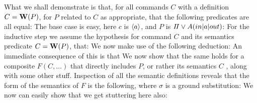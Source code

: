 What we shall demonstrate is that, for all commands $C$
with a definition $C = \mathbf{W}(P)$, for $P$ related to $C$ as appropriate,
that the following predicates are all equal:
The base case is easy, here $c$ is $\langle a\rangle$,
and $P$ is $I\!I \lor A(in|a|out)$:
For the inductive step we assume the hypothesis
for command $C$ and its semantics predicate  $C = \mathbf{W}(P)$,
that:
We now make use of the following deduction:
An immediate consequence of this is that
We now show that the same holds for a composite $F(C,\ldots)$
that directly includes $P$, or rather its semantics $C$
, along with some other stuff.
Inspection of all the semantic definitions reveals
that the form of the semantics of $F$ is the following,
where $\sigma$ is a ground substitution:
We now can easily show that we get stuttering here also:
